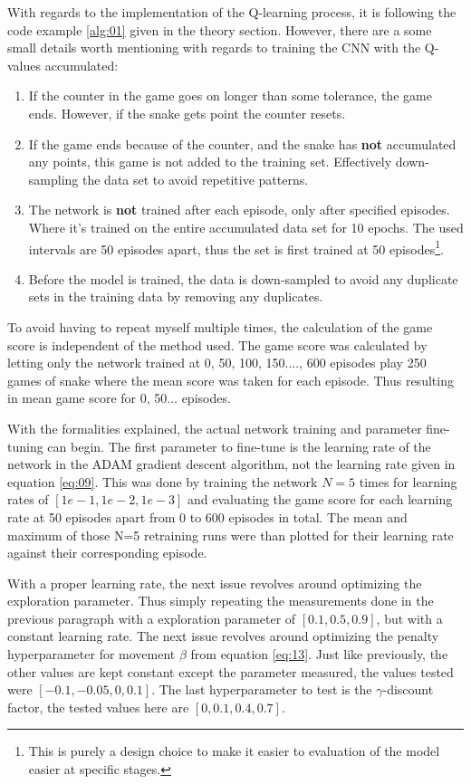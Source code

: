 \documentclass[%
 uio,
 jmp,
 amsmath,amssymb,
 reprint, nofootinbib]{revtex4-1}
\numberwithin{equation}{section}
\begin{document}
With regards to the implementation of the Q-learning process, it is following the code example \ref{alg:01} given in the theory section. However, there are a some small details worth mentioning with regards to training the CNN with the Q-values accumulated:
\begin{enumerate}
\item If the counter in the game goes on longer than some tolerance, the game ends. However, if the snake gets point the counter resets.
\item If the game ends because of the counter, and the snake has \textbf{not} accumulated any points, this game is not added to the training set. Effectively down-sampling the data set to avoid repetitive patterns.
\item The network is \textbf{not} trained after each episode, only after specified episodes. Where it's trained on the entire accumulated data set for 10 epochs. The used intervals are 50 episodes apart, thus the set is first trained at 50 episodes\footnote{This is purely a design choice to make it easier to evaluation of the model easier at specific stages.}.
\item Before the model is trained, the data is down-sampled to avoid any duplicate sets in the training data by removing any duplicates.
\end{enumerate}

To avoid having to repeat myself multiple times, the calculation of the game score is independent of the method used. The game score was calculated by letting only the network trained at 0, 50, 100, 150...., 600 episodes play 250 games of snake where the mean score was taken for each episode. Thus resulting in mean game score for 0, 50... episodes.

With the formalities explained, the actual network training and parameter fine-tuning can begin. The first parameter to fine-tune is the learning rate of the network in the ADAM gradient descent algorithm, not the learning rate given in equation \ref{eq:09}. This was done by training the network \(N=5\) times for learning rates of \([1e-1, 1e-2, 1e-3]\) and evaluating the game score for each learning rate at 50 episodes apart from 0 to 600 episodes in total. The mean and maximum of those N=5 retraining runs were than plotted for their learning rate against their corresponding episode.

With a proper learning rate, the next issue revolves around optimizing the exploration parameter. Thus simply repeating the measurements done in the previous paragraph with a exploration parameter of \([0.1, 0.5, 0.9]\), but with a constant learning rate. The next issue revolves around optimizing the penalty hyperparameter for movement \(\beta\) from equation \ref{eq:13}. Just like previously, the other values are kept constant except the parameter measured, the values tested were \([-0.1, -0.05, 0, 0.1]\). The last hyperparameter to test is the \(\gamma\)-discount factor, the tested values here are \([0, 0.1, 0.4, 0.7]\).
\end{document}
